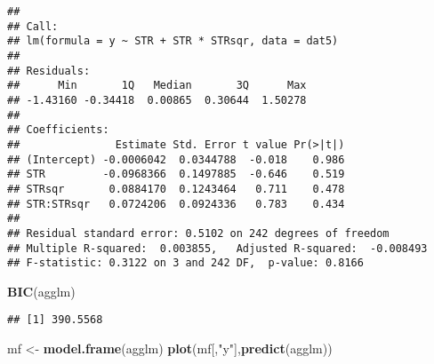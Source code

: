 \documentclass[
]{article}
\newenvironment{Shaded}{\begin{snugshade}}{\end{snugshade}}
\newcommand{\DataTypeTok}[1]{\textcolor[rgb]{0.13,0.29,0.53}{#1}}
\newcommand{\KeywordTok}[1]{\textcolor[rgb]{0.13,0.29,0.53}{\textbf{#1}}}
\newcommand{\NormalTok}[1]{#1}
\newcommand{\OperatorTok}[1]{\textcolor[rgb]{0.81,0.36,0.00}{\textbf{#1}}}
\newcommand{\OtherTok}[1]{\textcolor[rgb]{0.56,0.35,0.01}{#1}}
\newcommand{\StringTok}[1]{\textcolor[rgb]{0.31,0.60,0.02}{#1}}
\begin{document}
\begin{Shaded}
\end{Shaded}

\begin{verbatim}
## 
## Call:
## lm(formula = y ~ STR + STR * STRsqr, data = dat5)
## 
## Residuals:
##      Min       1Q   Median       3Q      Max 
## -1.43160 -0.34418  0.00865  0.30644  1.50278 
## 
## Coefficients:
##               Estimate Std. Error t value Pr(>|t|)
## (Intercept) -0.0006042  0.0344788  -0.018    0.986
## STR         -0.0968366  0.1497885  -0.646    0.519
## STRsqr       0.0884170  0.1243464   0.711    0.478
## STR:STRsqr   0.0724206  0.0924336   0.783    0.434
## 
## Residual standard error: 0.5102 on 242 degrees of freedom
## Multiple R-squared:  0.003855,   Adjusted R-squared:  -0.008493 
## F-statistic: 0.3122 on 3 and 242 DF,  p-value: 0.8166
\end{verbatim}

\begin{Shaded}
\begin{Highlighting}[]
\KeywordTok{BIC}\NormalTok{(agglm)}
\end{Highlighting}
\end{Shaded}

\begin{verbatim}
## [1] 390.5568
\end{verbatim}

\begin{Shaded}
\begin{Highlighting}[]
\NormalTok{mf <-}\StringTok{ }\KeywordTok{model.frame}\NormalTok{(agglm)}
\KeywordTok{plot}\NormalTok{(mf[,}\StringTok{"y"}\NormalTok{],}\KeywordTok{predict}\NormalTok{(agglm))}
\end{Highlighting}
\end{Shaded}
\end{document}
